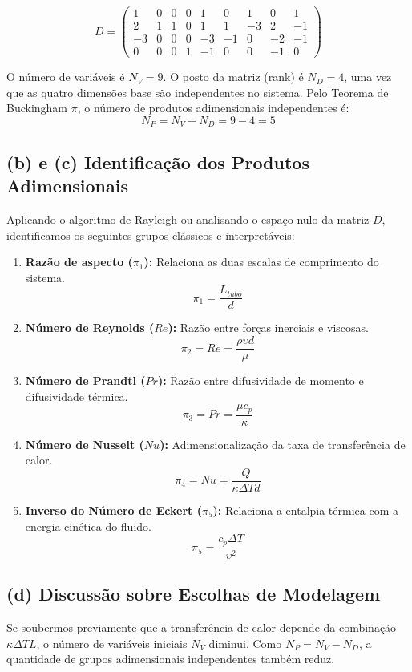 \documentclass{article}
\begin{document}
\[
D = \left( \begin{array}{ccccccccc}
1 & 0 & 0 & 0 & 1 & 0 & 1 & 0 & 1 \\
2 & 1 & 1 & 0 & 1 & 1 & -3 & 2 & -1 \\
-3 & 0 & 0 & 0 & -3 & -1 & 0 & -2 & -1 \\
0 & 0 & 0 & 1 & -1 & 0 & 0 & -1 & 0 
\end{array} \right)
\]

O número de variáveis é $N_V = 9$. O posto da matriz (rank) é $N_D = 4$, uma vez que as quatro dimensões base são independentes no sistema. Pelo Teorema de Buckingham $\pi$, o número de produtos adimensionais independentes é:
\[ N_P = N_V - N_D = 9 - 4 = 5 \]

\subsection*{(b) e (c) Identificação dos Produtos Adimensionais}
Aplicando o algoritmo de Rayleigh ou analisando o espaço nulo da matriz $D$, identificamos os seguintes grupos clássicos e interpretáveis:

\begin{enumerate}
    \item \textbf{Razão de aspecto ($\pi_1$):} Relaciona as duas escalas de comprimento do sistema.
    \[ \pi_1 = \frac{L_{tubo}}{d} \]
    \item \textbf{Número de Reynolds ($Re$):} Razão entre forças inerciais e viscosas.
    \[ \pi_2 = Re = \frac{\rho \upsilon d}{\mu} \]
    \item \textbf{Número de Prandtl ($Pr$):} Razão entre difusividade de momento e difusividade térmica.
    \[ \pi_3 = Pr = \frac{\mu c_p}{\kappa} \]
    \item \textbf{Número de Nusselt ($Nu$):} Adimensionalização da taxa de transferência de calor.
    \[ \pi_4 = Nu = \frac{Q}{\kappa \Delta T d} \]
    \item \textbf{Inverso do Número de Eckert ($\pi_5$):} Relaciona a entalpia térmica com a energia cinética do fluido.
    \[ \pi_5 = \frac{c_p \Delta T}{\upsilon^2} \]
\end{enumerate}

\subsection*{(d) Discussão sobre Escolhas de Modelagem}
Se soubermos previamente que a transferência de calor depende da combinação $\kappa \Delta T L$, o número de variáveis iniciais $N_V$ diminui. Como $N_P = N_V - N_D$, a quantidade de grupos adimensionais independentes também reduz.
\end{document}
